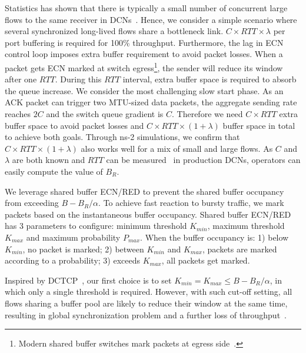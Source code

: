 \vspace{-1mm}
Statistics has shown that there is typically a small number of concurrent large flows to the same receiver in DCNs~\cite{dctcp}. Hence, we consider a simple scenario where several synchronized long-lived flows share a bottleneck link. $C\times RTT\times \lambda$ per port buffering is required for 100\% throughput. Furthermore, the lag in ECN control loop imposes extra buffer requirement to avoid packet losses. When a packet gets ECN marked at switch egress\footnote{Modern shared buffer switches mark packets at egress side~\cite{ecn_or_delay}.}, the sender will reduce its window after one $RTT$. During this $RTT$ interval, extra buffer space is required to absorb the queue increase. We consider the most challenging slow start phase. As an ACK packet can trigger two MTU-sized data packets, the aggregate sending rate reaches $2C$ and the switch queue gradient is $C$. Therefore we need $C\times RTT$ extra buffer space to avoid packet losses and $C\times RTT\times (1+\lambda)$ buffer space in total to achieve both goals. Through ns-2 simulations, we confirm that $C\times RTT\times (1+\lambda)$ also works well for a mix of small and large flows. As $C$ and $\lambda$ are both known and $RTT$ can be measured~\cite{pingmesh,tuning} in production DCNs, operators can easily compute the value of $B_R$.

\vspace{-1mm}
We leverage shared buffer ECN/RED to prevent the shared buffer occupancy from exceeding $B-B_{R}/\alpha$. To achieve fast reaction to bursty traffic, we mark packets based on the instantaneous buffer occupancy. Shared buffer ECN/RED has 3 parameters to configure: minimum threshold $K_{min}$, maximum threshold $K_{max}$ and maximum probability $P_{max}$. When the buffer occupancy is: 1) below $K_{min}$, no packet is marked; 2) between $K_{min}$ and $K_{max}$, packets are marked according to a probability; 3) exceeds $K_{max}$, all packets get marked.

Inspired by  DCTCP~\cite{dctcp}, our first choice is to set $K_{min}=K_{max}\leq B-B_{R}/\alpha$, in which only a single threshold is required. However, with such cut-off setting, all flows sharing a buffer pool are likely to reduce their window at the same time, resulting in global synchronization problem and a further loss of throughput~\cite{RED}.

